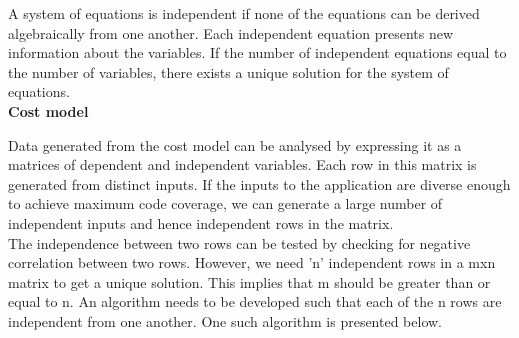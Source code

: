 \documentclass[11pt]{article}
\begin{document}
A system of equations is independent if none of the equations can be derived algebraically from one another. Each independent equation presents new information about the variables. If the number of independent equations equal to the number of variables, there exists a unique solution for the system of equations.\newline
\\\textbf{Cost model} 

Data generated from the cost model can be analysed by expressing it as a matrices of dependent and independent variables. Each row in this matrix is generated from distinct inputs. If the inputs to the application are diverse enough to achieve maximum code coverage, we can generate a large number of independent inputs and hence independent rows in the matrix.\newline
\\The independence between two rows can be tested by checking for negative correlation between two rows. However, we need 'n' independent rows in a mxn matrix to get a unique solution. This implies that m should be greater than or equal to n. An algorithm needs to be developed such that each of the n rows are independent from one another. One such algorithm is presented below.
\end{document}
